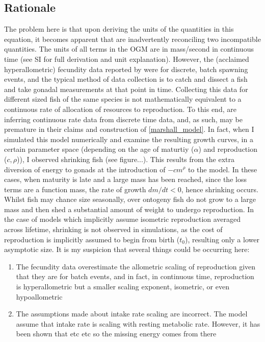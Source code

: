 \documentclass[a4paper]{article} %
\begin{document}
        \subsection{Rationale}
        The problem here is that upon deriving the units of the quantities in this equation, it becomes apparent that \cite{Marshall2019b} are inadvertently reconciling two incompatible quantities. The units of all terms in the OGM are in mass/second in continuous time (see SI for full derivation and unit explanation). However, the (acclaimed hyperallometric) fecundity data reported by \cite{Barneche2018d} were for discrete, batch spawning events, and the typical method of data collection is to catch and dissect a fish and take gonadal measurements at that point in time. Collecting this data for different sized fish of the same species is not mathematically equivalent to a continuous rate of allocation of resources to reproduction. To this end, \cite{Marshall2019b} are inferring continuous rate data from discrete time data, and, as such, may be premature in their claims and construction of \eqref{marshall_model}. In fact, when I simulated this model numerically and examine the resulting growth curves, in a certain parameter space (depending on the age of maturtiy ($\alpha$) and reproduction ($c, \rho$)), I observed shrinking fish (see figure...). This results from the extra diversion of energy to gonads at the introduction of $- cm^\rho$ to the model. In these cases, when maturity is late and a large mass has been reached, since the loss terms are a function mass, the rate of growth $dm/dt < 0$, hence shrinking occurs. Whilst fish may chance size seasonally, over ontogeny fish do not grow to a large mass and then shed a substantial amount of weight to undergo reproduction. In the case of models which implicitly assume isometric reproduction averaged across lifetime, shrinking is not observed in simulations, as the cost of reproduction is implicitly assumed to begin from birth ($t_0$), resulting only a lower asymptotic size. It is my suspicion that several things could be occurring here:
            \begin{enumerate}
                \item The fecundity data \autocite{Barneche2018d} overestimate the allometric scaling of reproduction given that they are for batch events, and in fact, in continuous time, reproduction is hyperallometric but a smaller scaling exponent, isometric, or even hypoallometric
                \item The assumptions made about intake rate scaling are incorrect. The \cite{West2001} model assume that intake rate is scaling with resting metabolic rate. However, it has been shown that \autocite{Pawar2012} etc etc so the missing energy comes from there
            \end{enumerate}
        
\end{document}

